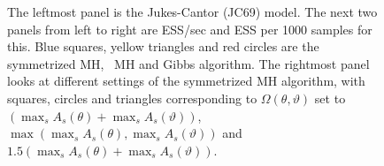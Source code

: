 \begin{figure}
\begin{minipage}[!hp]{0.24\linewidth}
\end{minipage}
  \caption{The leftmost panel is the Jukes-Cantor (JC69) model. The next two panels from left to right are ESS/sec and ESS per 1000 samples for this. 
    Blue squares, yellow triangles and red circles are the symmetrized MH, \naive\ MH and Gibbs algorithm.
    The rightmost panel looks at different settings of the symmetrized MH algorithm, with squares, circles and triangles corresponding to 
$\Omega(\theta,\vartheta)$ set to $(\max_s A_s(\theta) + \max_s A_s(\vartheta))$, $\max(\max_s A_s(\theta), \max_s A_s(\vartheta))$ and  $1.5(\max_s A_s(\theta) + \max_s A_s(\vartheta))$.
     \label{fig:ESS_JC}
   }
 \end{figure}

